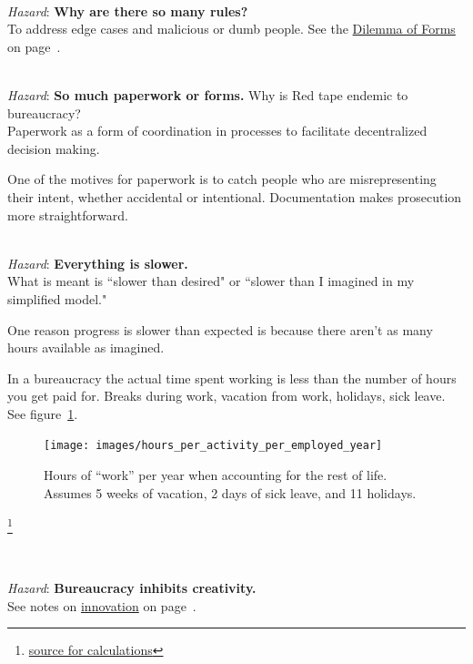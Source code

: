 \ \\
\textit{Hazard}: \textbf{Why are there so many rules?}\\
To address edge cases and malicious or dumb people. See the \href{table:dilemma-forms}{Dilemma of Forms} on page~\pageref{table:dilemma-forms}.

\ \\
\textit{Hazard}: \textbf{So much paperwork or forms.}
Why is Red tape endemic to bureaucracy?\\
Paperwork as a form of coordination in processes to facilitate decentralized decision making. 

One of the motives for paperwork is to catch people who are misrepresenting their intent, whether accidental or intentional. Documentation makes prosecution more straightforward.

\ \\
\textit{Hazard}: \textbf{Everything is slower.}\\
What is meant is ``slower than desired" or ``slower than I imagined in my simplified model."

One reason progress is slower than expected is because there aren't as many hours available as imagined.



In a bureaucracy the actual time spent working is less than the number of hours you get paid for. Breaks during work, vacation from work, holidays, sick leave. See figure~\ref{fig:hours_per_year}.


\begin{figure}[H]
    \centering
    \texttt{[image: images/hours\_per\_activity\_per\_employed\_year]}
    \caption{Hours of ``work'' per year when accounting for the rest of life. Assumes 5 weeks of vacation, 2 days of sick leave, and 11 holidays.}
    \label{fig:hours_per_year}
\end{figure}


\footnote{\href{https://docs.google.com/spreadsheets/d/1ZaOZZXWkEzX4fFltUdlR4A6ENrAXnkzTW4YrjA4tDO8/edit?usp=sharing}{source for calculations}}

\ \\
\begin{samepage}
\textit{Hazard}: \textbf{Bureaucracy inhibits creativity.}\\
See 
notes on \hyperref[sec:innovation]{innovation} on page~\pageref{sec:innovation}.
\end{samepage}

